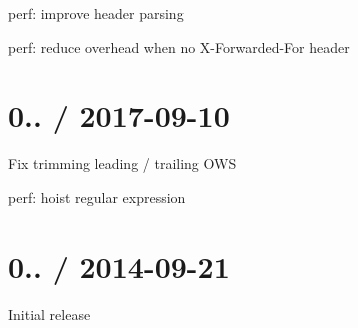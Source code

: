 
\begin{DoxyItemize}
\item perf\+: improve header parsing
\item perf\+: reduce overhead when no {\ttfamily X-\/\+Forwarded-\/\+For} header
\end{DoxyItemize}

\section*{0.. / 2017-\/09-\/10 }


\begin{DoxyItemize}
\item Fix trimming leading / trailing O\+WS
\item perf\+: hoist regular expression
\end{DoxyItemize}

\section*{0.. / 2014-\/09-\/21 }


\begin{DoxyItemize}
\item Initial release 
\end{DoxyItemize}
